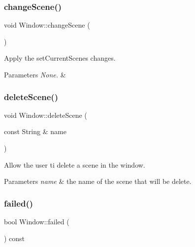 \subsubsection{\texorpdfstring{change\+Scene()}{changeScene()}}
{\footnotesize\ttfamily void Window\+::change\+Scene (\begin{DoxyParamCaption}{ }\end{DoxyParamCaption})}



Apply the set\+Current\+Scene\textquotesingle{}s changes. 


\begin{DoxyParams}{Parameters}
{\em None.} & \\
\hline
\end{DoxyParams}
\mbox{\label{classWindow_ad3a1ead02eca314e2df94e3e932fb5ae}} 
\subsubsection{\texorpdfstring{delete\+Scene()}{deleteScene()}}
{\footnotesize\ttfamily void Window\+::delete\+Scene (\begin{DoxyParamCaption}\item[{const String \&}]{name }\end{DoxyParamCaption})}



Allow the user ti delete a scene in the window. 


\begin{DoxyParams}{Parameters}
{\em \textquotesingle{}name\textquotesingle{}} & the name of the scene that will be delete. \\
\hline
\end{DoxyParams}
\mbox{\label{classWindow_aa0dde1e5d56fd85fc1615bf34d67c9e0}} 
\subsubsection{\texorpdfstring{failed()}{failed()}}
{\footnotesize\ttfamily bool Window\+::failed (\begin{DoxyParamCaption}{ }\end{DoxyParamCaption}) const}



